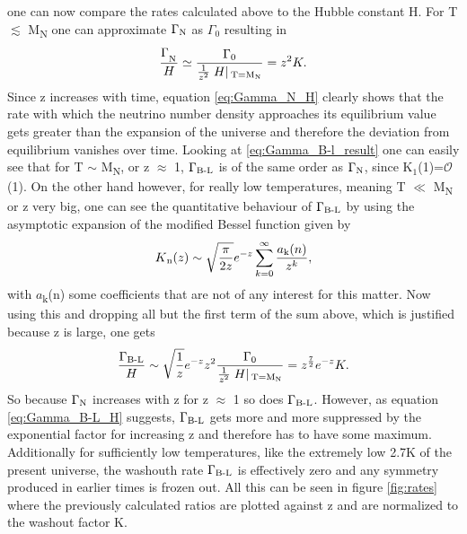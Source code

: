 one can now compare the rates calculated above to the Hubble constant H.\newline\indent
For T $\lesssim$ M\textsubscript{N} one can approximate $\Gamma\textsubscript{N}$ as $\Gamma_0$ resulting in 
\begin{equation}
	\frac{\Gamma_\textsubscript{N}}{H}\simeq\frac{\Gamma_0}{\frac{1}{z^2}\left.H\right|\textsubscript{T=M\textsubscript{N}}}=z^2K.
	\label{eq:Gamma_N_H}
\end{equation}
Since z increases with time, equation \eqref{eq:Gamma_N_H} clearly shows that the rate with which the neutrino number density approaches its equilibrium value gets greater than the expansion of the universe and therefore the deviation from equilibrium vanishes over time. \newline\indent
Looking at \eqref{eq:Gamma_B-l_result} one can easily see that for T $\sim$ M\textsubscript{N}, or z $\approx$ 1, $\Gamma\textsubscript{B-L}$ is of the same order as $\Gamma\textsubscript{N}$, since K$_1$(1)=$\mathcal{O}$(1). On the other hand however, for really low temperatures, meaning T $\ll$ M\textsubscript{N} or z very big, one can see the quantitative behaviour of $\Gamma\textsubscript{B-L}$ by using the asymptotic expansion of the modified Bessel function given by
\begin{equation*}
	K\textsubscript{n}(z)\sim\sqrt{\frac{\pi}{2z}}e^{-z}\sum_{k=0}^{\infty}\frac{a\textsubscript{k}(n)}{z^k},
\end{equation*}
with $a$\textsubscript{k}(n) some coefficients that are not of any interest for this matter. Now using this and dropping all but the first term of the sum above, which is justified because z is large, one gets
\begin{equation}
	\frac{\Gamma\textsubscript{B-L}}{H}\sim\sqrt{\frac{1}{z}}e^{-z}z^2\frac{\Gamma_0}{\frac{1}{z^2}\left.H\right|\textsubscript{T=M\textsubscript{N}}}=z^\frac{7}{2}e^{-z}K.
	\label{eq:Gamma_B-L_H}
\end{equation}
So because $\Gamma\textsubscript{N}$ increases with z for z $\approx$ 1 so does $\Gamma\textsubscript{B-L}$. However, as equation \eqref{eq:Gamma_B-L_H} suggests, $\Gamma\textsubscript{B-L}$ gets more and more suppressed by the exponential factor for increasing z and therefore has to have some maximum. Additionally for sufficiently low temperatures, like the extremely low 2.7K of the present universe, the washouth rate $\Gamma\textsubscript{B-L}$ is effectively zero and any symmetry produced in earlier times is frozen out. 
All this can be seen in figure \ref{fig:rates} where the previously calculated ratios are plotted against z and are normalized to the washout factor K.
